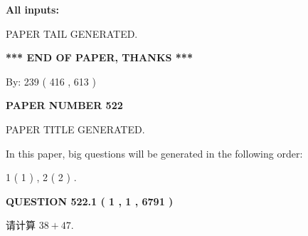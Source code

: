 \documentclass{ctexart}
\begin{document}
   
   
   
\noindent\vspace{0.1in}\hspace{-0.08in} {\textbf{\Large{All inputs: }}}
   
   
   
   
   
   
 \vspace{0.2in}
 
   
   
\vspace{2.0in} PAPER TAIL GENERATED.
   
   
   
   
\vspace{1.0in} 
{\textbf{\large{ *** END OF PAPER, THANKS *** }}} 
   
   
\hspace{1.0in} By: 
 239 ( 416 ,  613 )
   
   
   
   
\newpage 
\setcounter{page}{ 
   522001 } 
   
   
   
   
 {\textbf{ \Large{ PAPER NUMBER  522  }}}
   
   
\vspace{0.2in}
   
   
   
   
   
   
   
   
 \vspace{0.2in}
 
 
 
 
   
   
 PAPER TITLE GENERATED.
   
   
   
\vspace{0.2in}
   
In this paper, big questions will be generated in the following order: 
   
   
   1 ( 1 )
 ,
   2 ( 2 )
 .
  
\vspace{0.2in}
  
{\textbf{\Large{QUESTION
522.1 
 ( 1 , 1 , 6791 )
}}}
  
  
 
请计算 $ %
38 +  %
47 $.
 
 
 
\noindent{}
 
\end{document}
